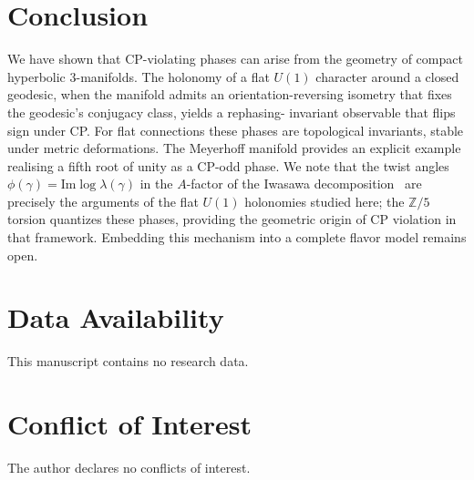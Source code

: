 \documentclass[epjc3]{svjour3}
\begin{document}
\section{Conclusion}

We have shown that CP-violating phases can arise from the geometry of
compact hyperbolic $3$-manifolds.  The holonomy of a flat $U(1)$ character
around a closed geodesic, when the manifold admits an orientation-reversing
isometry that fixes the geodesic’s conjugacy class, yields a rephasing-
invariant observable that flips sign under CP.  For flat connections these
phases are topological invariants, stable under metric deformations.
The Meyerhoff manifold provides an explicit example realising a fifth
root of unity as a CP-odd phase.
We note that the twist angles $\phi(\gamma)=\mathrm{Im}\log\lambda(\gamma)$
in the $A$-factor of the Iwasawa decomposition~\cite{Gentry:CKM,Gentry:PMNS}
are precisely the arguments of the flat $U(1)$ holonomies studied here;
the $\mathbb{Z}/5$ torsion quantizes these phases, providing the geometric
origin of CP violation in that framework.
Embedding this mechanism into a complete flavor model remains open.

\section*{Data Availability}
This manuscript contains no research data.

\section*{Conflict of Interest}
The author declares no conflicts of interest.
\end{document}
